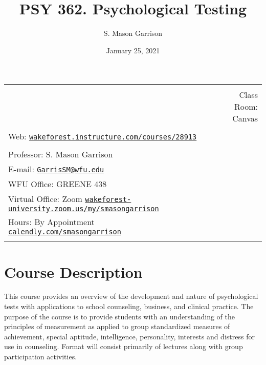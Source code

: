 \documentclass[11pt,]{article}
\title{PSY 362. Psychological Testing}
\author{S. Mason Garrison}
\date{January 25, 2021}
\begin{document}
		\maketitle
	

		\thispagestyle{firststyle}



\noindent \begin{tabular*}{\textwidth}{ @{\extracolsep{\fill}} lr @{\extracolsep{\fill}}}
\hline\\
    &  Class Room: Canvas
%
\\\hline\\
%
 Web: \href{https://wakeforest.instructure.com/courses/28913}{\tt wakeforest.instructure.com/courses/28913}&  \\ %
&  \\
Professor: S. Mason Garrison \\

E-mail: \texttt{\href{mailto:GarrisSM@wfu.edu}{\nolinkurl{GarrisSM@wfu.edu}}}  \\

WFU Office: GREENE 438   \\
Virtual Office: Zoom
\href{https://wakeforest-university.zoom.us/my/smasongarrison}{\tiny\tt wakeforest-university.zoom.us/my/smasongarrison}   \\
Hours: By Appointment
\href{https://calendly.com/smasongarrison/}{\small\tt calendly.com/smasongarrison}  \\


	&  \\
	\hline
\end{tabular*}

\vspace{2mm}

\hypertarget{course-description}{%
\section{Course Description}\label{course-description}}

This course provides an overview of the development and nature of
psychological tests with applications to school counseling, business,
and clinical practice. The purpose of the course is to provide students
with an understanding of the principles of measurement as applied to
group standardized measures of achievement, special aptitude,
intelligence, personality, interests and distress for use in counseling.
Format will consist primarily of lectures along with group participation
activities.
\end{document}
